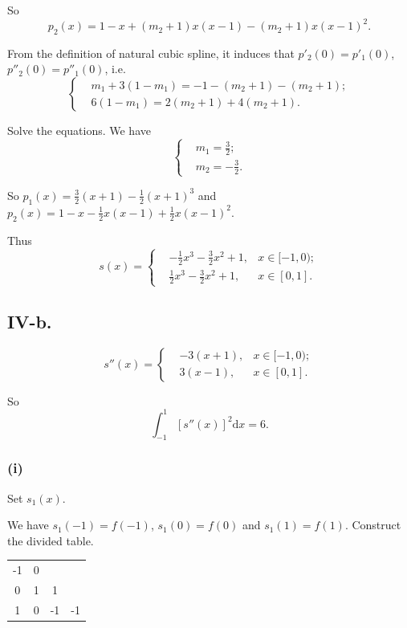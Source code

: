 \documentclass[a4paper]{article}
\begin{document}
So $$p_2(x)=1-x+(m_2+1)x(x-1)-(m_2+1)x(x-1)^2.$$

From the definition of natural cubic spline, it induces that $p'_2(0)=p'_1(0)$, $p''_2(0)=p''_1(0)$, i.e.
$$
\left\{
\begin{aligned}
  &m_1+3(1-m_1)=-1-(m_2+1)-(m_2+1);\\
  &6(1-m_1)=2(m_2+1)+4(m_2+1).
\end{aligned}
\right.
$$

Solve the equations. We have 
$$
\left\{
\begin{aligned}
  &m_1=\frac{3}{2};\\
  &m_2=-\frac{3}{2}.
\end{aligned}
\right.
$$

So $p_1(x)=\frac{3}{2}(x+1)-\frac{1}{2}(x+1)^3$ and $p_2(x)=1-x-\frac{1}{2}x(x-1)+\frac{1}{2}x(x-1)^2$.

Thus
$$
s(x)=
\left\{
\begin{aligned}
  &-\frac{1}{2}x^3-\frac{3}{2}x^2+1, &x\in [-1,0);\\
  &\frac{1}{2}x^3-\frac{3}{2}x^2+1, &x\in [0,1].
\end{aligned}
\right.
$$

\subsection*{IV-b.}
$$
s''(x)=
\left\{
\begin{aligned}
  &-3(x+1), &x\in [-1,0);\\
  &3(x-1), &x\in [0,1].
\end{aligned}
\right.
$$

So 
$$
\int_{-1}^{1}[s''(x)]^2 \mathrm{d}x=6.
$$

\subsubsection*{(i)}
Set $s_1(x)$.

We have $s_1(-1)=f(-1)$, $s_1(0)=f(0)$ and $s_1(1)=f(1)$. Construct the divided table.

\begin{table}[H]
  \centering
  \begin{tabular}{c|ccc}
    -1 & 0 & &  \\
    0 & 1 & 1 &   \\
    1 & 0 & -1 & -1  \\
  \end{tabular}
\end{table}
\end{document}
